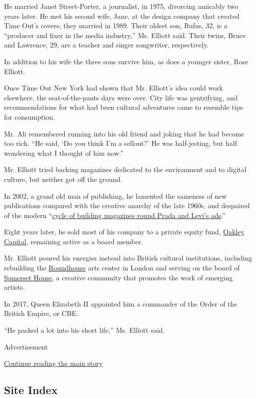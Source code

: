 He married Janet Street-Porter, a journalist, in 1975, divorcing
amicably two years later. He met his second wife, Jane, at the design
company that created Time Out's covers; they married in 1989. Their
oldest son, Rufus, 32, is a ``producer and fixer in the media
industry,'' Ms. Elliott said. Their twins, Bruce and Lawrence, 29, are a
teacher and singer songwriter, respectively.

In addition to his wife the three sons survive him, as does a younger
sister, Rose Elliott.

Once Time Out New York had shown that Mr. Elliott's idea could work
elsewhere, the seat-of-the-pants days were over. City life was
gentrifying, and recommendations for what had been cultural adventures
came to resemble tips for consumption.

Mr. Ali remembered running into his old friend and joking that he had
become too rich. ``He said, `Do you think I'm a sellout?' He was
half-jesting, but half wondering what I thought of him now.''

Mr. Elliott tried backing magazines dedicated to the environment and to
digital culture, but neither got off the ground.

In 2002, a grand old man of publishing, he lamented the sameness of new
publications compared with the creative anarchy of the late 1960s, and
despaired of the modern
``\href{https://www.independent.co.uk/news/media/a-lost-cause-181556.html}{cycle
of building magazines round Prada and Levi's ads}.''

Eight years later, he sold most of his company to a private equity fund,
\href{https://oakleycapital.com/}{Oakley Capital}, remaining active as a
board member.

Mr. Elliott poured his energies instead into British cultural
institutions, including rebuilding the
\href{https://www.roundhouse.org.uk/}{Roundhouse} arts center in London
and serving on the board of
\href{https://www.somersethouse.org.uk/about-somerset-house}{Somerset
House}, a creative community that promotes the work of emerging artists.

In 2017, Queen Elizabeth II appointed him a commander of the Order of
the British Empire, or CBE.

``He packed a lot into his short life,'' Ms. Elliott said.

Advertisement

\protect\hyperlink{after-bottom}{Continue reading the main story}

\hypertarget{site-index}{%
\subsection{Site Index}\label{site-index}}


